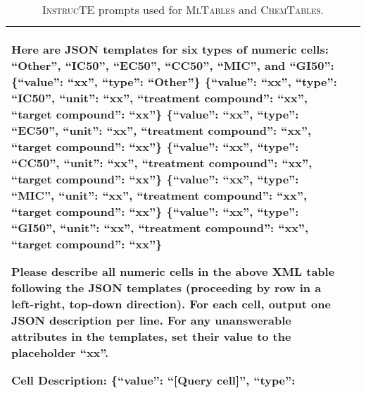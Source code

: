 \documentclass[11pt]{article}
\newcommand\method{\textsc{InstrucTE}}
\newcommand\data{\textsc{MlTables}}
\newcommand{\chemtables}{\textsc{ChemTables}}
\begin{document}
\begin{table*}[th!]
{\begin{tabular}{lL{11cm}}
Here are JSON templates for six types of numeric cells: ``Other'', ``IC50'', ``EC50'', ``CC50'', ``MIC'', and ``GI50'':\newline
\{``value'': ``xx'', ``type'': ``Other''\}\newline
\{``value'': ``xx'', ``type'': ``IC50'', ``unit'': ``xx'', ``treatment compound'': ``xx'', ``target compound'': ``xx''\}\newline
\{``value'': ``xx'', ``type'': ``EC50'', ``unit'': ``xx'', ``treatment compound'': ``xx'', ``target compound'': ``xx''\}\newline
\{``value'': ``xx'', ``type'': ``CC50'', ``unit'': ``xx'', ``treatment compound'': ``xx'', ``target compound'': ``xx''\}\newline
\{``value'': ``xx'', ``type'': ``MIC'', ``unit'': ``xx'', ``treatment compound'': ``xx'', ``target compound'': ``xx''\}\newline
\{``value'': ``xx'', ``type'': ``GI50'', ``unit'': ``xx'', ``treatment compound'': ``xx'', ``target compound'': ``xx''\}\newline

Please describe all numeric cells in the above XML table following the JSON templates (proceeding by row in a left-right, top-down direction). For each cell, output one JSON description per line. For any unanswerable attributes in the templates, set their value to the placeholder ``xx''.\newline

Cell Description:\newline
\{``value'': ``[Query cell]'', ``type'':
\\ 

 \bottomrule
\end{tabular}
}

\caption{\label{tab:full_prompt_ml_chem} \method{} prompts used for \data{} and \chemtables{}.
}
\end{table*}
\end{document}
